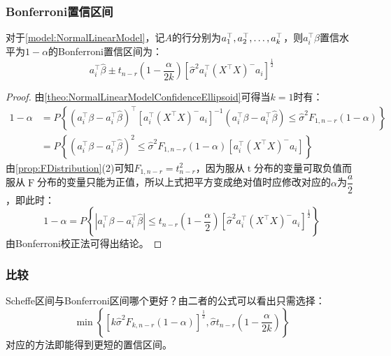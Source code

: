 \subsubsection{Bonferroni置信区间}
\begin{theorem}\label{theo:BonferroniCI}
	对于\cref{model:NormalLinearModel}，记$A$的行分别为$a^{\top}_1, a^{\top}_2, \dots, a^{\top}_{k}$，则$a_
	i^{\top}\beta$置信水平为$1-\alpha$的Bonferroni置信区间为：
	\begin{equation*}
		a_i^{\top}\hat{\beta}\pm t_{n-r}\left(1-\frac{\alpha}{2k}\right)[\hat{\sigma}^2a_i^{\top}(X^{\top}X)^-a_i]^{\frac{1}{2}}
	\end{equation*}
\end{theorem}
\begin{proof}
	由\cref{theo:NormalLinearModelConfidenceEllipsoid}可得当$k=1$时有：
	\begin{align*}
		1-\alpha&=P\left\{(a_i^{\top}\beta-a_i^{\top}\hat{\beta})^{\top}[a_i^{\top}(X^{\top}X)^-a_i]^{-1}(a_i^{\top}\beta-a_i^{\top}\hat{\beta})\leqslant\hat{\sigma}^2F_{1,n-r}(1-\alpha)\right\} \\
		&=P\left\{(a_i^{\top}\beta-a_i^{\top}\hat{\beta})^2\leqslant\hat{\sigma}^2F_{1,n-r}(1-\alpha)[a_i^{\top}(X^{\top}X)^-a_i]\right\}
	\end{align*}
	由\cref{prop:FDistribution}(2)可知$F_{1,n-r}=t^2_{n-r}$，因为服从$\operatorname{t}$分布的变量可取负值而服从$\operatorname{F}$分布的变量只能为正值，所以上式把平方变成绝对值时应修改对应的$\alpha$为$\dfrac{a}{2}$，即此时：
	\begin{equation*}
		1-\alpha=P\left\{|a_i^{\top}\beta-a_i^{\top}\hat{\beta}|\leqslant t_{n-r}\left(1-\frac{\alpha}{2}\right)[\hat{\sigma}^2a_i^{\top}(X^{\top}X)^-a_i]^{\frac{1}{2}}\right\}
	\end{equation*}
	由Bonferroni校正法可得出结论。
\end{proof}
\subsubsection{比较}
\begin{derivation}
	Scheffe区间与Bonferroni区间哪个更好？由二者的公式可以看出只需选择：
	\begin{equation*}
		\min\left\{[k\hat{\sigma}^2F_{k,n-r}(1-\alpha)]^{\frac{1}{2}},\hat{\sigma}t_{n-r}\left(1-\frac{\alpha}{2k}\right)\right\}
	\end{equation*}
	对应的方法即能得到更短的置信区间。
\end{derivation}

